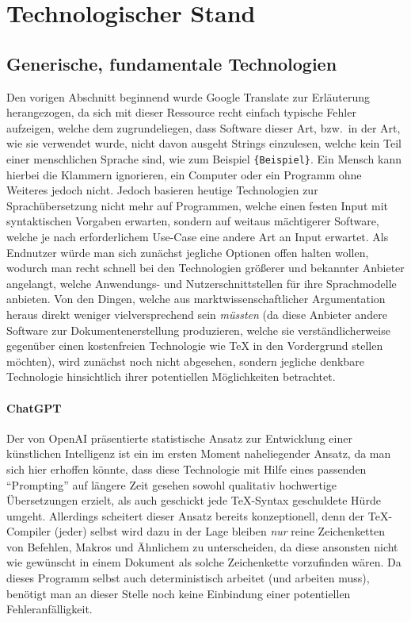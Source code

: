 \section{Technologischer Stand}
\subsection{Generische, fundamentale Technologien}
Den vorigen Abschnitt beginnend wurde Google Translate zur Erläuterung herangezogen, da sich mit dieser Ressource recht einfach typische Fehler aufzeigen, welche dem zugrundeliegen, dass Software dieser Art, bzw.\ in der Art, wie sie verwendet wurde, nicht davon ausgeht Strings einzulesen, welche kein Teil einer menschlichen Sprache sind, wie zum Beispiel \verb|{Beispiel}|. Ein Mensch kann hierbei die Klammern ignorieren, ein Computer oder ein Programm ohne Weiteres jedoch nicht.%
Jedoch basieren heutige Technologien zur Sprachübersetzung nicht mehr auf Programmen, welche einen festen Input mit syntaktischen Vorgaben erwarten, sondern auf weitaus mächtigerer Software, welche je nach erforderlichem Use-Case eine andere Art an Input erwartet. Als Endnutzer würde man sich zunächst jegliche Optionen offen halten wollen, wodurch man recht schnell bei den Technologien größerer und bekannter Anbieter angelangt, welche Anwendungs- und Nutzerschnittstellen für ihre Sprachmodelle anbieten. Von den Dingen, welche aus marktwissenschaftlicher Argumentation heraus direkt weniger vielversprechend sein \textit{müssten} (da diese Anbieter andere Software zur Dokumentenerstellung produzieren, welche sie verständlicherweise gegenüber einen kostenfreien Technologie wie \TeX{} in den Vordergrund stellen möchten), wird zunächst noch nicht abgesehen, sondern jegliche denkbare Technologie hinsichtlich ihrer potentiellen Möglichkeiten betrachtet. 

\paragraph*{ChatGPT}\label{par:chatgpt}
Der von OpenAI präsentierte statistische Ansatz zur Entwicklung einer künstlichen Intelligenz ist ein im ersten Moment naheliegender Ansatz, da man sich hier erhoffen könnte, dass diese Technologie mit Hilfe eines passenden \enquote{Prompting} auf längere Zeit gesehen sowohl qualitativ hochwertige Übersetzungen erzielt, als auch geschickt jede \TeX{}-Syntax geschuldete Hürde umgeht. Allerdings scheitert dieser Ansatz%
bereits konzeptionell, denn der \TeX{}-Compiler (jeder) selbst wird dazu in der Lage bleiben \textit{nur} reine Zeichenketten von Befehlen, Makros und Ähnlichem zu unterscheiden, da diese ansonsten nicht wie gewünscht in einem Dokument als solche Zeichenkette vorzufinden wären. Da dieses Programm selbst auch deterministisch arbeitet (und arbeiten muss), benötigt man an dieser Stelle noch keine Einbindung einer potentiellen Fehleranfälligkeit.



